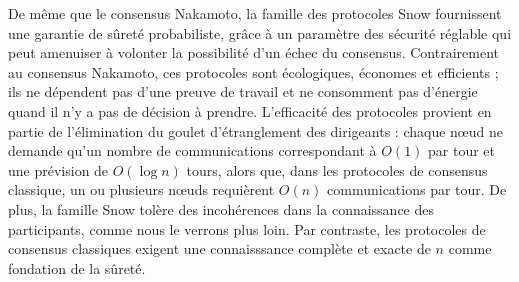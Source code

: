 \documentclass[letterpaper,twocolumn,10pt]{article}
\newcommand{\Oh}[1]{O(#1)}
\theoremstyle{definition}
\begin{document}
De même que le consensus Nakamoto, la famille des protocoles Snow fournissent une garantie de sûreté probabiliste, grâce à un paramètre des sécurité réglable qui peut amenuiser à volonter la possibilité d'un échec du consensus.
Contrairement au consensus Nakamoto, ces protocoles sont écologiques, économes et efficients ; ils ne dépendent pas d'une preuve de travail\cite{DworkN92} et ne consomment pas d'énergie quand il n'y a pas de décision à prendre.
L'efficacité des protocoles provient en partie de l'élimination du goulet d'étranglement des dirigeants : chaque nœud ne demande qu'un nombre de communications correspondant à $\Oh{1}$ par tour et une prévision de $\Oh{\log{n}}$ tours, alors que, dans les protocoles de consensus classique, un ou plusieurs nœuds requièrent $\Oh{n}$ communications par tour.
De plus, la famille Snow tolère des incohérences dans la connaissance des participants, comme nous le verrons plus loin. Par contraste, les protocoles de consensus classiques exigent une connaisssance complète et exacte de $n$ comme fondation de la sûreté.
\end{document}
